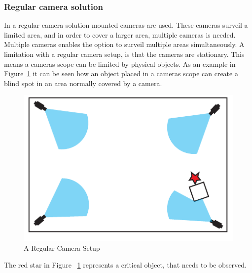 \subsubsection{Regular camera solution}
In a regular camera solution mounted cameras are used. These cameras surveil a limited area, and in order to cover a larger area, multiple cameras is needed. Multiple cameras enables the option to surveil multiple areas simultaneously.
A limitation with a regular camera setup, is that the cameras are stationary.
This means a cameras scope can be limited by physical objects.
As an example in Figure~\ref{fig:refular_camera_setup} it can be seen how an object placed in a cameras scope can create a blind spot in an area normally covered by a camera.
\begin{figure}[htb]
    \centering
    \includegraphics[width=\textwidth]{gfx/regular_camera_setup.pdf}
    \caption{A Regular Camera Setup}
    \label{fig:refular_camera_setup}
\end{figure}
The red star in Figure ~\ref{fig:refular_camera_setup} represents a critical object, that needs to be observed.

